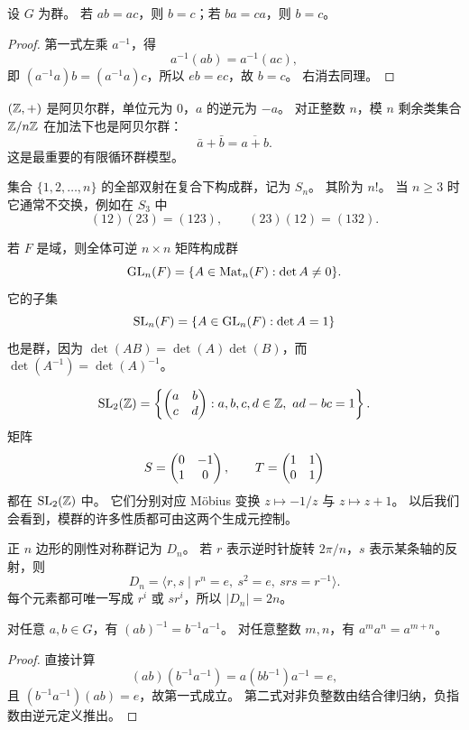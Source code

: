 \begin{proposition}[消去律]
设 $G$ 为群。
若 $ab=ac$，则 $b=c$；若 $ba=ca$，则 $b=c$。
\end{proposition}
\begin{proof}
第一式左乘 $a^{-1}$，得
\[ a^{-1}(ab)=a^{-1}(ac), \]
即 $(a^{-1}a)b=(a^{-1}a)c$，所以 $eb=ec$，故 $b=c$。
右消去同理。
\end{proof}
\begin{example}
$(\mathbb{Z},+)$ 是阿贝尔群，单位元为 $0$，$a$ 的逆元为 $-a$。
对正整数 $n$，模 $n$ 剩余类集合 $\mathbb{Z}/n\mathbb{Z}$ 在加法下也是阿贝尔群：
\[ \bar a+\bar b=\overline{a+b}. \]
这是最重要的有限循环群模型。
\end{example}
\begin{example}[对称群 $S_n$]
集合 $\{1,2,\dots,n\}$ 的全部双射在复合下构成群，记为 $S_n$。
其阶为 $n!$。
当 $n\ge 3$ 时它通常不交换，例如在 $S_3$ 中
\[ (12)(23)=(123),\qquad (23)(12)=(132). \]
\end{example}
\begin{example}[矩阵群]
若 $F$ 是域，则全体可逆 $n\times n$ 矩阵构成群
\[ \mathrm{GL}_n(F)=\{A\in \mathrm{Mat}_n(F):\det A\ne 0\}. \]
它的子集
\[ \mathrm{SL}_n(F)=\{A\in \mathrm{GL}_n(F):\det A=1\} \]
也是群，因为 $\det(AB)=\det(A)\det(B)$，而 $\det(A^{-1})=\det(A)^{-1}$。
\end{example}
\begin{example}[模形式中的基本群 $\SL_2(\Z)$]
\[ \mathrm{SL}_2(\mathbb{Z})=\left\{\begin{pmatrix} a&b\\c&d \end{pmatrix}:a,b,c,d\in \mathbb{Z},\ ad-bc=1\right\}. \]
矩阵
\[ S=\begin{pmatrix} 0&-1\\1&0 \end{pmatrix},\qquad T=\begin{pmatrix} 1&1\\0&1 \end{pmatrix} \]
都在 $\SL_2(\Z)$ 中。
它们分别对应 Möbius 变换 $z\mapsto -1/z$ 与 $z\mapsto z+1$。
以后我们会看到，模群的许多性质都可由这两个生成元控制。
\end{example}
\begin{example}[二面体群 $D_n$]
正 $n$ 边形的刚性对称群记为 $D_n$。
若 $r$ 表示逆时针旋转 $2\pi/n$，$s$ 表示某条轴的反射，则
\[ D_n=\langle r,s\mid r^n=e,\ s^2=e,\ srs=r^{-1}\rangle. \]
每个元素都可唯一写成 $r^i$ 或 $sr^i$，所以 $|D_n|=2n$。
\end{example}
\begin{proposition}
对任意 $a,b\in G$，有 $(ab)^{-1}=b^{-1}a^{-1}$。
对任意整数 $m,n$，有 $a^ma^n=a^{m+n}$。
\end{proposition}
\begin{proof}
直接计算
\[ (ab)(b^{-1}a^{-1})=a(bb^{-1})a^{-1}=e, \]
且 $(b^{-1}a^{-1})(ab)=e$，故第一式成立。
第二式对非负整数由结合律归纳，负指数由逆元定义推出。
\end{proof}
